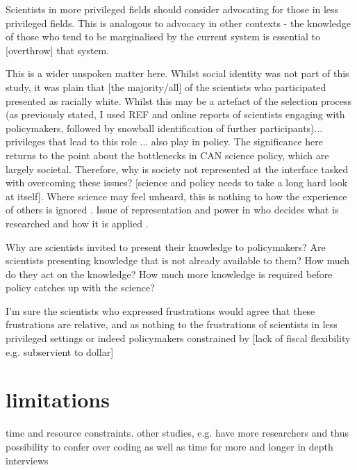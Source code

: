 Scientists in more privileged fields should consider advocating for those in less privileged fields. This is analogous to advocacy in other contexts - the knowledge of those who tend to be marginalised by the current system is essential to [overthrow] that system.

This is a wider unspoken matter here. Whilst social identity was not part of this study, it was plain that [the majority/all] of the scientists who participated presented as racially white. Whilst this may be a artefact of the selection process (as previously stated, I used REF and online reports of scientists engaging with policymakers, followed by snowball identification of further participants)... privileges that lead to this role ... also play in policy. The significance here returns to the point about the bottlenecks in CAN science policy, which are largely societal. Therefore, why is society not represented at the interface tasked with overcoming these issues? [science and policy needs to take a long hard look at itself]. Where science may feel unheard, this is nothing to how the experience of others is ignored \cite{IbarraJOBCIMRS2022}. Issue of representation and power in who decides what is researched and how it is applied \cite{McNiePS2017}.

Why are scientists invited to present their knowledge to policymakers? Are scientists presenting knowledge that is not already available to them? How much do they act on the knowledge? How much more knowledge is required before policy catches up with the science?

I'm sure the scientists who expressed frustrations would agree that these frustrations are relative, and as nothing to the frustrations of scientists in less privileged settings or indeed policymakers constrained by [lack of fiscal flexibility e.g. subservient to dollar]


\section{limitations}
time and resource constraints. other studies, e.g. \cite{HaynesDCRHGS2011,OjanenBKP2021} have more researchers and thus possibility to confer over coding as well as time for more and longer in depth interviews

